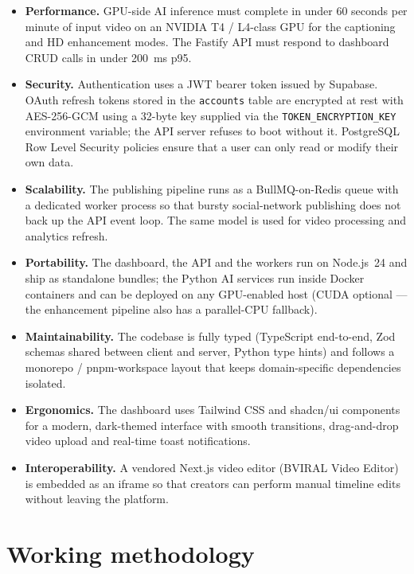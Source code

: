 \begin{itemize}
  \item \textbf{Performance.} GPU-side AI inference must complete in under 60 seconds per
        minute of input video on an NVIDIA T4 / L4-class GPU for the captioning and HD
        enhancement modes. The Fastify API must respond to dashboard CRUD calls in under
        200~ms p95.
  \item \textbf{Security.} Authentication uses a JWT bearer token issued by Supabase. OAuth
        refresh tokens stored in the \texttt{accounts} table are encrypted at rest with
        AES-256-GCM using a 32-byte key supplied via the \texttt{TOKEN\_ENCRYPTION\_KEY}
        environment variable; the API server refuses to boot without it. PostgreSQL Row
        Level Security policies ensure that a user can only read or modify their own data.
  \item \textbf{Scalability.} The publishing pipeline runs as a BullMQ-on-Redis queue with a
        dedicated worker process so that bursty social-network publishing does not back up
        the API event loop. The same model is used for video processing and analytics
        refresh.
  \item \textbf{Portability.} The dashboard, the API and the workers run on Node.js~24 and
        ship as standalone bundles; the Python AI services run inside Docker containers and
        can be deployed on any GPU-enabled host (CUDA optional --- the enhancement pipeline
        also has a parallel-CPU fallback).
  \item \textbf{Maintainability.} The codebase is fully typed (TypeScript end-to-end, Zod
        schemas shared between client and server, Python type hints) and follows a
        monorepo / pnpm-workspace layout that keeps domain-specific dependencies isolated.
  \item \textbf{Ergonomics.} The dashboard uses Tailwind CSS and shadcn/ui components for a
        modern, dark-themed interface with smooth transitions, drag-and-drop video upload
        and real-time toast notifications.
  \item \textbf{Interoperability.} A vendored Next.js video editor (BVIRAL Video Editor) is
        embedded as an iframe so that creators can perform manual timeline edits without
        leaving the platform.
\end{itemize}

\section{Working methodology}
\label{sec:methodology}

